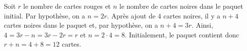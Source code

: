Soit $r$ le nombre de cartes rouges et $n$ le nombre de cartes noires dans le paquet initial. Par hypothèse, on a $n=2r$. Après ajout de $4$ cartes noires, il y a $n+4$ cartes noires dans le paquet et, par hypothèse, on a $n+4=3r$. Ainsi, $4=3r-n=3r-2r=r$ et $n=2\cdot 4=8$. Initialement, le paquet contient donc $r+n=4+8=12$ cartes.